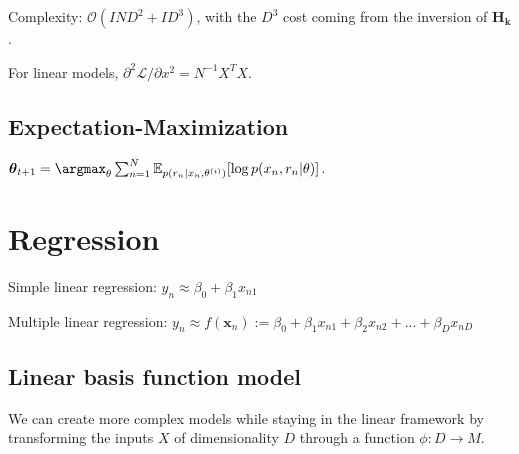 \documentclass[10pt,a4paper,landscape]{article}
\renewcommand{\bf}[1]{\ensuremath{\mathbf{#1}}}
\newcommand{\btheta}{\boldsymbol\theta}
\begin{document}
\begin{multicols*}{4}
Complexity: $\mathcal{O}(I N D^2 + I D^3)$, with the $D^3$ cost coming from the inversion of $\bf{H_k}$.

For linear models, $\partial^2\mathcal{L}/\partial x^2 = N^{-1}X^TX$.

\subsection{Expectation-Maximization}




$\btheta_{t+1} = \argmax_{\theta} \sum_{n=1}^N\mathbb{E}_{p(r_n | x_n, \theta^{(i)})}[\log p(x_n, r_n | \theta)]$.

\section{Regression}
Simple linear regression: $y_n \approx \beta_0 + \beta_1 x_{n1}$

Multiple linear regression: $y_n \approx f(\bf{x}_n) := \beta_0 + \beta_1 x_{n1} + \beta_2 x_{n2} + ... + \beta_D x_{nD}$

\subsection{Linear basis function model}
We can create more complex models while staying in the linear framework by transforming the inputs $X$ of dimensionality $D$ through a function $\phi : D \rightarrow M$.


\end{multicols*}
\end{document}
